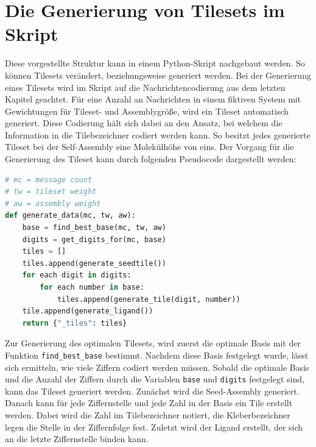 \section{Die Generierung von Tilesets im Skript}

Diese vorgestellte Struktur kann in einem Python-Skript nachgebaut werden. So können Tilesets verändert, beziehungsweise generiert werden. Bei der Generierung eines Tilesets wird im Skript auf die Nachrichtencodierung aus dem letzten Kapitel geachtet. Für eine Anzahl an Nachrichten in einem fiktiven System mit Gewichtungen für Tileset- und Assemblygröße, wird ein Tileset automatisch generiert. Diese Codierung hält sich dabei an den Ansatz, bei welchem die Information in die Tilebezeichner codiert werden kann. So besitzt jedes generierte Tileset bei der Self-Assembly eine Molekülhöhe von eins. Der Vorgang für die Generierung des Tileset kann durch folgenden Pseudocode dargestellt werden:
\begin{lstlisting}[language=python, caption={[Pseudocode für die Generierung eines Tilesets]{Pseudocode für die Generierung eines Tilesets für gegebene Anzahl zu kodierenden Nachrichten und den Gewichtungen von Tileset- und Assemblygröße. Es wird die optimale Basis für die Anzahl der Nachrichten nach den gegebenen Gewichtungen berechnet. Anschließend werden aus der Anzahl und der Basis die erforderlichen Ziffern ermittelt. Mit beiden Parametern kann das Tileset generiert werden.}}, label=lst:generate]
# mc = message count 
# tw = tileset weight 
# aw = assembly weight
def generate_data(mc, tw, aw):
    base = find_best_base(mc, tw, aw)
    digits = get_digits_for(mc, base)
    tiles = []
    tiles.append(generate_seedtile())
    for each digit in digits:
        for each number in base:
            tiles.append(generate_tile(digit, number))
    tile.append(generate_ligand())    
    return {"_tiles": tiles}
\end{lstlisting}
Zur Generierung des optimalen Tilesets, wird zuerst die optimale Basis mit der Funktion \texttt{find\_best\_base} bestimmt. Nachdem diese Basis festgelegt wurde, lässt sich ermitteln, wie viele Ziffern codiert werden müssen. Sobald die optimale Basis und die Anzahl der Ziffern durch die Variablen \texttt{base} und \texttt{digits} festgelegt sind, kann das Tileset generiert werden. Zunächst wird die Seed-Assembly generiert. Danach kann für jede Ziffernstelle und jede Zahl in der Basis ein Tile erstellt werden. Dabei wird die Zahl im Tilebezeichner notiert, die Kleberbezeichner legen die Stelle in der Ziffernfolge fest. Zuletzt wird der Ligand erstellt, der sich an die letzte Ziffernstelle binden kann. 

